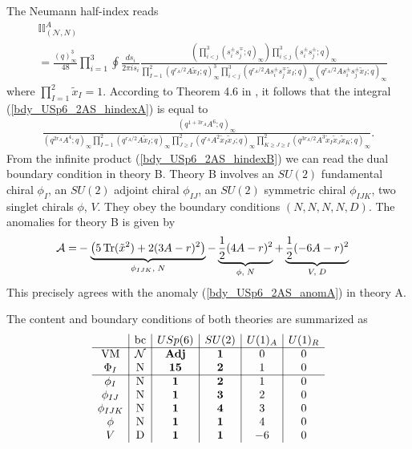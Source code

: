 \documentclass[12pt]{article}
\newcommand{\Acal}{\mathcal{A}}
\DeclareMathOperator*{\Tr}{{\rm Tr}}
\numberwithin{equation}{section}
\begin{document}
The Neumann half-index reads
\begin{align}
\label{bdy_USp6_2AS_hindexA}
&\mathbb{II}_{(\mathcal{N},N)}^A
\nonumber\\
&=\frac{(q)_{\infty}^3}{48} \prod_{i=1}^3 \oint \frac{ds_i}{2\pi i s_i}
\frac{\left( \prod_{i < j}^3 (s_i^{\pm} s_j^{\mp}; q)_{\infty} \right) \prod_{i \le j}^3 (s_i^{\pm} s_j^{\pm}; q)_{\infty}}
{\prod_{I = 1}^2 (q^{r_A/2} A \tilde{x}_I; q)_{\infty}^3 \prod_{i < j}^3 (q^{r_A/2} A s_i^{\pm} s_j^{\mp} \tilde{x}_I; q)_{\infty} (q^{r_A/2} A s_i^{\pm} s_j^{\pm} \tilde{x}_I; q)_{\infty}}
\end{align}
where $\prod_{I = 1}^2 \tilde{x}_I = 1$.
According to Theorem 4.6 in \cite{MR1266569}, it follows that 
the integral (\ref{bdy_USp6_2AS_hindexA}) is equal to 
\begin{align}
\label{bdy_USp6_2AS_hindexB}
 \frac{(q^{1 + 3r_A} A^6; q)_{\infty}}{(q^{2r_A} A^4; q)_{\infty} \prod_{I=1}^{2} (q^{r_A/2} A \tilde{x}_I; q)_{\infty} \prod_{J \ge I}^{2} (q^{r_A} A^2 \tilde{x}_I \tilde{x}_J; q)_{\infty} \prod_{K \ge J \ge I}^2 (q^{3r_A/2} A^3 \tilde{x}_I \tilde{x}_J \tilde{x}_K; q)_{\infty}}. 
\end{align}
From the infinite product (\ref{bdy_USp6_2AS_hindexB}) we can read the dual boundary condition in theory B. 
Theory B involves 
an $SU(2)$ fundamental chiral $\phi_I$, 
an $SU(2)$ adjoint chiral $\phi_{IJ}$, 
an $SU(2)$ symmetric chiral $\phi_{IJK}$, 
two singlet chirals $\phi$, $V$. 
They obey the boundary conditions $(N,N,N,N,D)$. 
The anomalies for theory B is given by
\begin{align}
\label{bdy_USp6_2AS_anom}
\Acal = 
 & - \underbrace{\left( 5\Tr(\tilde{x}^2) + 2(3A-r)^2 \right)}_{\phi_{IJK}, \; N}
  - \underbrace{\frac{1}{2}(4A-r)^2}_{\phi, \; N}
   + \underbrace{\frac{1}{2}(-6A-r)^2}_{V, \; D}
\end{align}
This precisely agrees with the anomaly (\ref{bdy_USp6_2AS_anomA}) in theory A. 

The content and boundary conditions of both theories are summarized as
\begin{align}
\label{USp6_2AS_charges}
\begin{array}{c|c|c|c|c|c}
& \textrm{bc} & USp(6) & SU(2) & U(1)_A & U(1)_R \\ \hline
\textrm{VM} & \mathcal{N} & {\bf Adj} & {\bf 1} & 0 & 0 \\
\Phi_I & \textrm{N} & {\bf 15} & {\bf 2} & 1 & 0 \\
 \hline
\phi_{I} & \textrm{N} & {\bf 1} & {\bf 2} & 1 & 0 \\
\phi_{IJ} & \textrm{N} & {\bf 1} & {\bf 3} & 2 & 0 \\
\phi_{IJK} & \textrm{N} & {\bf 1} & {\bf 4} & 3 & 0 \\
\phi & \textrm{N} & {\bf 1} & {\bf 1} & 4 & 0 \\
V & \textrm{D} & {\bf 1} & {\bf 1} & -6 & 0
\end{array}
\end{align}
\end{document}
